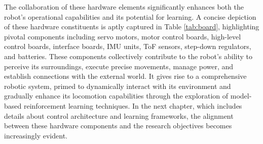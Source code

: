 The collaboration of these hardware elements significantly enhances both the robot's operational capabilities and its potential for learning. A concise depiction of these hardware constituents is aptly captured in Table \ref{tab:board}, highlighting pivotal components including servo motors, motor control boards, high-level control boards, interface boards, \ac{IMU} units, \ac{ToF} sensors, step-down regulators, and batteries. These components collectively contribute to the robot's ability to perceive its surroundings, execute precise movements, manage power, and establish connections with the external world. It gives rise to a comprehensive robotic system, primed to dynamically interact with its environment and gradually enhance its locomotion capabilities through the exploration of model-based reinforcement learning techniques. In the next chapter, which includes details about control architecture and learning frameworks, the alignment between these hardware components and the research objectives becomes increasingly evident.


